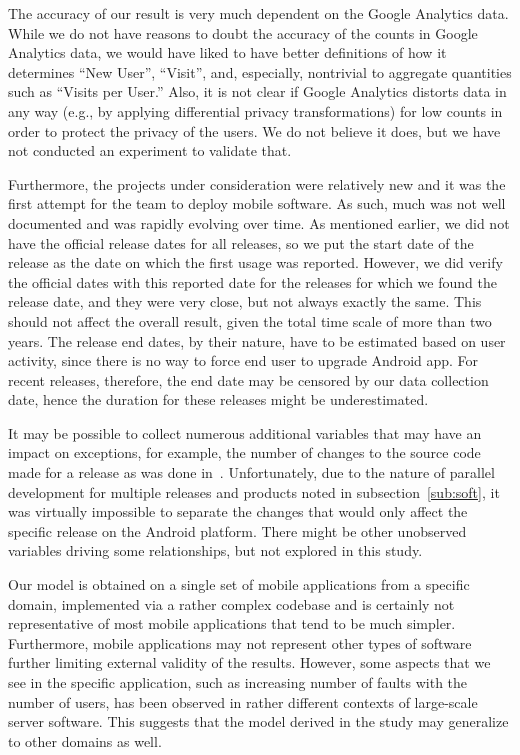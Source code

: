 \documentclass[smallextended]{svjour3}       %
\begin{document}
The accuracy of our result is very much dependent on the Google
Analytics data. While we do not have reasons to doubt the accuracy of
the counts in Google
Analytics data, we would have liked to have better definitions of
how it determines ``New User'', ``Visit'', and, especially,
nontrivial to aggregate quantities such as ``Visits per User.'' Also,
it is not clear if Google
Analytics distorts data in any way (e.g., by applying differential 
privacy transformations) for low counts in order to protect
the privacy of the users. We do not believe it does, but we have not
conducted an experiment to validate that. 

Furthermore, the projects under consideration were relatively new and
it was the first attempt for the team to deploy mobile software. As
such, much was not well documented and was rapidly
evolving over time. As mentioned earlier, we did not have the official release
dates for all releases, so we put the start date of the release as
the date on which the first usage was reported. However, we did
verify the official dates with this reported date for the releases
for which we found the release date, and they were very close, but
not always exactly the same. This should not affect
the overall result, given the total time scale of more than two
years. The release end dates, by their nature, have to be estimated 
based on user activity, since there is no way to force end user
to upgrade Android app. For recent releases, therefore, the end date 
may be censored by our data
collection date, hence the duration for these releases might be
underestimated. 

It may be possible to collect numerous additional variables that may
have an impact on exceptions, for example, the number of changes to
the source code made for a release as was done
in~\cite{IQ08}. Unfortunately, due to the nature of parallel
development for multiple releases and products noted in
subsection~\ref{sub:soft}, it was virtually impossible to separate
the changes that would only affect the specific release on the Android
platform. There might be other unobserved variables driving some
relationships, but not explored in this study. 

Our model is obtained on a single set of mobile applications 
from a specific domain, implemented via
a rather complex codebase and is certainly not representative of
most mobile applications that tend to be much simpler. Furthermore,
mobile applications  
may not represent other types of software further limiting external
validity of the results. However, some aspects that we see in the
specific application, such as increasing number of faults with the
number of users, has been observed in rather different contexts of
large-scale server software. This suggests that the model derived in
the study may generalize to other domains as well. 
\end{document}
